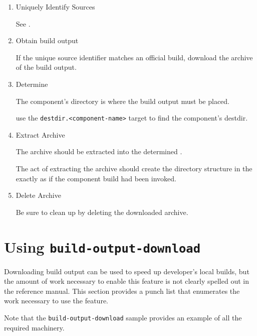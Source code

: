 \begin{enumerate}
\item{Uniquely Identify Sources}

  See .

\item Obtain build output

  If the unique source identifier matches an official build, download
  the archive of the build output.

\item{Determine \destdir}

  The component's \destdir directory is where the build output must be
  placed.

  use the \texttt{destdir.<component-name>} \lmsbwcmd target to find
  the component's destdir.

\item{Extract Archive}

  The archive should be extracted into the determined \destdir.

  The act of extracting the archive should create the directory
  structure in the \destdir exactly as if the component build had been
  invoked.

\item{Delete Archive}

  Be sure to clean up by deleting the downloaded archive.

\end{enumerate}

\section{Using \texttt{build-output-download}}
\label{tips:using-build-output-download}

Downloading build output can be used to speed up developer's local
builds, but the amount of work necessary to enable this feature is not
clearly spelled out in the reference manual.  This section provides a
punch list that enumerates the work necessary to use the feature.

Note that the \texttt{build-output-download} sample provides an
example of all the required machinery.

